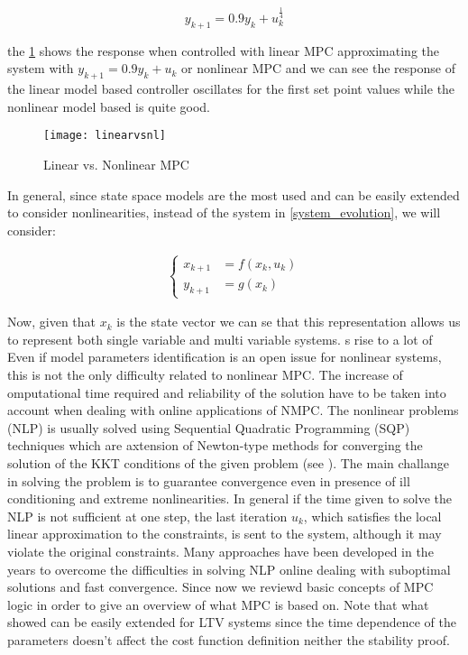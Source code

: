 \begin{equation}
y_{k+1}=0.9y_k+u_k^{\frac{1}{4}}
\end{equation}

the \ref{linearvsnl} shows the response when controlled with linear MPC approximating the system with $y_{k+1} = 0.9y_k+u_k$ or nonlinear MPC and we can see the response of the linear model based controller oscillates for the first set point values while the nonlinear model based is quite good. 


\begin{figure}[h!]
	\centering
	\texttt{[image: linearvsnl]}
	\caption{Linear vs. Nonlinear MPC}
	\label{linearvsnl}
\end{figure}


In general, since state space models are the most used and can be easily extended to consider nonlinearities, instead of the system in \ref{system_evolution}, we will consider:

\begin{equation}
\begin{split}
		\begin{cases}
			x_{k+1}&=f(x_k,u_k) \\
			y_{k+1}&=g(x_k)
		\end{cases}
	\end{split}
\end{equation} 

Now, given that $x_k$ is the state vector we can se that this representation allows us to represent both single variable and multi variable systems.
s rise to a lot of
Even if model parameters identification is an open issue for nonlinear systems, this is not the only difficulty related to nonlinear MPC. The increase of omputational time required and reliability of the solution have to be taken into account when dealing with online applications of NMPC. 
The nonlinear problems (NLP) is usually solved using Sequential Quadratic Programming
(SQP) techniques which are axtension of Newton-type methods for converging the solution of the KKT conditions of the given problem (see \cite{skkt}). The main challange in solving the problem is to guarantee convergence even in presence of ill conditioning and extreme nonlinearities.
In general if the time given to solve the NLP is not sufficient at one step, the last iteration $u_k$, which satisfies the local linear approximation to the constraints, is sent to the system, although it may violate the original constraints. Many approaches have been developed in the years to overcome the difficulties in solving NLP online dealing with suboptimal solutions and fast convergence. Since now we reviewd basic concepts of MPC logic in order to give an overview of what MPC is based on. Note that what showed can be easily extended for LTV systems since the time dependence of the parameters doesn't affect the cost function definition neither the stability proof.